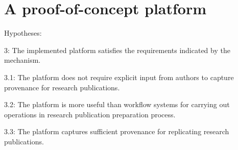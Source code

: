 
\section{A proof-of-concept platform}
Hypotheses:

3: The implemented platform satisfies the requirements indicated by the mechanism.

3.1: The platform does not require explicit input from authors to capture provenance for research publications.

3.2: The platform is more useful than workflow systems for carrying out operations in research publication preparation process.

3.3: The platform captures sufficient provenance for replicating research publications.


 
 


 
 



